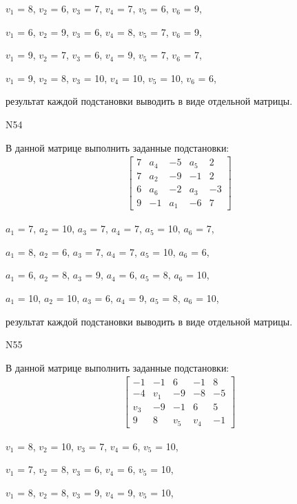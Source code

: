 \documentclass[11pt]{report}
\begin{document}
$v_{1}$ = 8, $v_{2}$ = 6, $v_{3}$ = 7, $v_{4}$ = 7, $v_{5}$ = 6, $v_{6}$ = 9, 

$v_{1}$ = 6, $v_{2}$ = 9, $v_{3}$ = 6, $v_{4}$ = 8, $v_{5}$ = 7, $v_{6}$ = 9, 

$v_{1}$ = 9, $v_{2}$ = 7, $v_{3}$ = 6, $v_{4}$ = 9, $v_{5}$ = 7, $v_{6}$ = 7, 

$v_{1}$ = 9, $v_{2}$ = 8, $v_{3}$ = 10, $v_{4}$ = 10, $v_{5}$ = 10, $v_{6}$ = 6, 

результат каждой подстановки выводить в виде отдельной матрицы.

N54

В данной матрице выполнить заданные подстановки:
\begin{align*}
\left[\begin{matrix}7 & a_{4} & -5 & a_{5} & 2\\7 & a_{2} & -9 & -1 & 2\\6 & a_{6} & -2 & a_{3} & -3\\9 & -1 & a_{1} & -6 & 7\end{matrix}\right]
\end{align*}


$a_{1}$ = 7, $a_{2}$ = 10, $a_{3}$ = 7, $a_{4}$ = 7, $a_{5}$ = 10, $a_{6}$ = 7, 

$a_{1}$ = 8, $a_{2}$ = 6, $a_{3}$ = 7, $a_{4}$ = 7, $a_{5}$ = 10, $a_{6}$ = 6, 

$a_{1}$ = 6, $a_{2}$ = 8, $a_{3}$ = 9, $a_{4}$ = 6, $a_{5}$ = 8, $a_{6}$ = 10, 

$a_{1}$ = 10, $a_{2}$ = 10, $a_{3}$ = 6, $a_{4}$ = 9, $a_{5}$ = 8, $a_{6}$ = 10, 

результат каждой подстановки выводить в виде отдельной матрицы.

N55

В данной матрице выполнить заданные подстановки:
\begin{align*}
\left[\begin{matrix}-1 & -1 & 6 & -1 & 8\\-4 & v_{1} & -9 & -8 & -5\\v_{3} & -9 & -1 & 6 & 5\\9 & 8 & v_{5} & v_{4} & -1\end{matrix}\right]
\end{align*}


$v_{1}$ = 8, $v_{2}$ = 10, $v_{3}$ = 7, $v_{4}$ = 6, $v_{5}$ = 10, 

$v_{1}$ = 7, $v_{2}$ = 8, $v_{3}$ = 6, $v_{4}$ = 6, $v_{5}$ = 10, 

$v_{1}$ = 8, $v_{2}$ = 8, $v_{3}$ = 9, $v_{4}$ = 9, $v_{5}$ = 10, 
\end{document}
